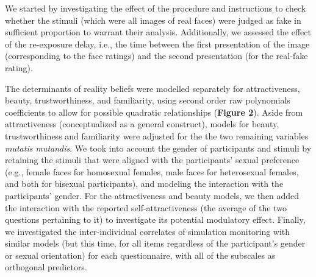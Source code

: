 \documentclass[
  man,floatsintext]{apa6}
\begin{document}
We started by investigating the effect of the procedure and instructions to check whether the stimuli (which were all images of real faces) were judged as fake in sufficient proportion to warrant their analysis. Additionally, we assessed the effect of the re-exposure delay, i.e., the time between the first presentation of the image (corresponding to the face ratings) and the second presentation (for the real-fake rating).

The determinants of reality beliefs were modelled separately for attractiveness, beauty, trustworthiness, and familiarity, using second order raw polynomials coefficients to allow for possible quadratic relationships (\textbf{Figure 2}). Aside from attractiveness (conceptualized as a general construct), models for beauty, trustworthiness and familiarity were adjusted for the the two remaining variables \emph{mutatis mutandis}. We took into account the gender of participants and stimuli by retaining the stimuli that were aligned with the participants' sexual preference (e.g., female faces for homosexual females, male faces for heterosexual females, and both for bisexual participants), and modeling the interaction with the participants' gender. For the attractiveness and beauty models, we then added the interaction with the reported self-attractiveness (the average of the two questions pertaining to it) to investigate its potential modulatory effect. Finally, we investigated the inter-individual correlates of simulation monitoring with similar models (but this time, for all items regardless of the participant's gender or sexual orientation) for each questionnaire, with all of the subscales as orthogonal predictors.
\end{document}
